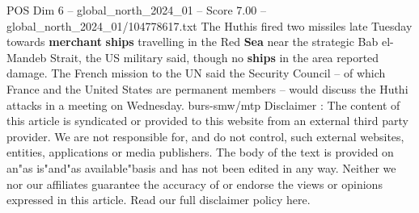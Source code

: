 \begin{textsample}{POS Dim 6 – global\_north\_2024\_01 – Score 7.00 – global\_north\_2024\_01/104778617.txt}
The Huthis fired two missiles late Tuesday towards \textbf{merchant} \textbf{ships} travelling in the Red \textbf{Sea} near the strategic Bab el-Mandeb Strait, the US military said, though no \textbf{ships} in the area reported damage.
The French mission to the UN said the Security Council -- of which France and the United States are permanent members -- would discuss the Huthi attacks in a meeting on Wednesday. burs-smw/mtp Disclaimer : The content of this article is syndicated or provided to this website from an external third party provider.
We are not responsible for, and do not control, such external websites, entities, applications or media publishers.
The body of the text is provided on an"as is"and"as available"basis and has not been edited in any way.
Neither we nor our affiliates guarantee the accuracy of or endorse the views or opinions expressed in this article.
Read our full disclaimer policy here.

\end{textsample}

